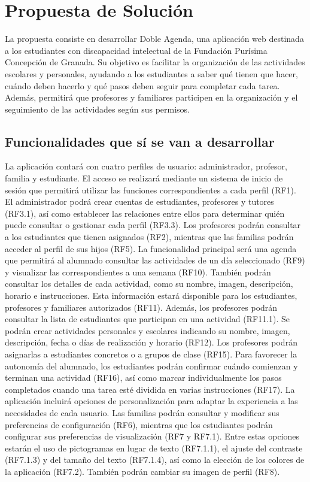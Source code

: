 \section{Propuesta de Solución}

La propuesta consiste en desarrollar Doble Agenda, una aplicación web destinada a los estudiantes con discapacidad intelectual de la Fundación Purísima Concepción de Granada. Su objetivo es facilitar la organización de las actividades escolares y personales, ayudando a los estudiantes a saber qué tienen que hacer, cuándo deben hacerlo y qué pasos deben seguir para completar cada tarea. Además, permitirá que profesores y familiares participen en la organización y el seguimiento de las actividades según sus permisos.
\subsection{Funcionalidades que sí se van a desarrollar}
La aplicación contará con cuatro perfiles de usuario: administrador, profesor, familia y estudiante. El acceso se realizará mediante un sistema de inicio de sesión que permitirá utilizar las funciones correspondientes a cada perfil (RF1). El administrador podrá crear cuentas de estudiantes, profesores y tutores (RF3.1), así como establecer las relaciones entre ellos para determinar quién puede consultar o gestionar cada perfil (RF3.3). Los profesores podrán consultar a los estudiantes que tienen asignados (RF2), mientras que las familias podrán acceder al perfil de sus hijos (RF5).
La funcionalidad principal será una agenda que permitirá al alumnado consultar las actividades de un día seleccionado (RF9) y visualizar las correspondientes a una semana (RF10). También podrán consultar los detalles de cada actividad, como su nombre, imagen, descripción, horario e instrucciones. Esta información estará disponible para los estudiantes, profesores y familiares autorizados (RF11). Además, los profesores podrán consultar la lista de estudiantes que participan en una actividad (RF11.1).
Se podrán crear actividades personales y escolares indicando su nombre, imagen, descripción, fecha o días de realización y horario (RF12). Los profesores podrán asignarlas a estudiantes concretos o a grupos de clase (RF15). Para favorecer la autonomía del alumnado, los estudiantes podrán confirmar cuándo comienzan y terminan una actividad (RF16), así como marcar individualmente los pasos completados cuando una tarea esté dividida en varias instrucciones (RF17).
La aplicación incluirá opciones de personalización para adaptar la experiencia a las necesidades de cada usuario. Las familias podrán consultar y modificar sus preferencias de configuración (RF6), mientras que los estudiantes podrán configurar sus preferencias de visualización (RF7 y RF7.1). Entre estas opciones estarán el uso de pictogramas en lugar de texto (RF7.1.1), el ajuste del contraste (RF7.1.3) y del tamaño del texto (RF7.1.4), así como la elección de los colores de la aplicación (RF7.2). También podrán cambiar su imagen de perfil (RF8). 
